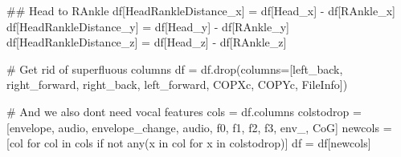 \documentclass[
  letterpaper,
  DIV=11,
  numbers=noendperiod]{scrreprt}
\newenvironment{Shaded}{\begin{snugshade}}{\end{snugshade}}
\newcommand{\BuiltInTok}[1]{\textcolor[rgb]{0.00,0.23,0.31}{#1}}
\newcommand{\CommentTok}[1]{\textcolor[rgb]{0.37,0.37,0.37}{#1}}
\newcommand{\ControlFlowTok}[1]{\textcolor[rgb]{0.00,0.23,0.31}{#1}}
\newcommand{\KeywordTok}[1]{\textcolor[rgb]{0.00,0.23,0.31}{#1}}
\newcommand{\NormalTok}[1]{\textcolor[rgb]{0.00,0.23,0.31}{#1}}
\newcommand{\OperatorTok}[1]{\textcolor[rgb]{0.37,0.37,0.37}{#1}}
\newcommand{\StringTok}[1]{\textcolor[rgb]{0.13,0.47,0.30}{#1}}
\begin{document}
\begin{Shaded}
\begin{Highlighting}[]
    \CommentTok{\#\# Head to RAnkle}
\NormalTok{    df[}\StringTok{\textquotesingle{}HeadRankleDistance\_x\textquotesingle{}}\NormalTok{] }\OperatorTok{=}\NormalTok{ df[}\StringTok{\textquotesingle{}Head\_x\textquotesingle{}}\NormalTok{] }\OperatorTok{{-}}\NormalTok{ df[}\StringTok{\textquotesingle{}RAnkle\_x\textquotesingle{}}\NormalTok{]}
\NormalTok{    df[}\StringTok{\textquotesingle{}HeadRankleDistance\_y\textquotesingle{}}\NormalTok{] }\OperatorTok{=}\NormalTok{ df[}\StringTok{\textquotesingle{}Head\_y\textquotesingle{}}\NormalTok{] }\OperatorTok{{-}}\NormalTok{ df[}\StringTok{\textquotesingle{}RAnkle\_y\textquotesingle{}}\NormalTok{]}
\NormalTok{    df[}\StringTok{\textquotesingle{}HeadRankleDistance\_z\textquotesingle{}}\NormalTok{] }\OperatorTok{=}\NormalTok{ df[}\StringTok{\textquotesingle{}Head\_z\textquotesingle{}}\NormalTok{] }\OperatorTok{{-}}\NormalTok{ df[}\StringTok{\textquotesingle{}RAnkle\_z\textquotesingle{}}\NormalTok{]}


    \CommentTok{\# Get rid of superfluous columns}
\NormalTok{    df }\OperatorTok{=}\NormalTok{ df.drop(columns}\OperatorTok{=}\NormalTok{[}\StringTok{\textquotesingle{}left\_back\textquotesingle{}}\NormalTok{, }\StringTok{\textquotesingle{}right\_forward\textquotesingle{}}\NormalTok{, }\StringTok{\textquotesingle{}right\_back\textquotesingle{}}\NormalTok{, }\StringTok{\textquotesingle{}left\_forward\textquotesingle{}}\NormalTok{, }\StringTok{\textquotesingle{}COPXc\textquotesingle{}}\NormalTok{, }\StringTok{\textquotesingle{}COPYc\textquotesingle{}}\NormalTok{, }\StringTok{\textquotesingle{}FileInfo\textquotesingle{}}\NormalTok{])}

    \CommentTok{\# And we also don\textquotesingle{}t need vocal features}
\NormalTok{    cols }\OperatorTok{=}\NormalTok{ df.columns}
\NormalTok{    colstodrop }\OperatorTok{=}\NormalTok{ [}\StringTok{\textquotesingle{}envelope\textquotesingle{}}\NormalTok{, }\StringTok{\textquotesingle{}audio\textquotesingle{}}\NormalTok{, }\StringTok{\textquotesingle{}envelope\_change\textquotesingle{}}\NormalTok{, }\StringTok{\textquotesingle{}audio\textquotesingle{}}\NormalTok{, }\StringTok{\textquotesingle{}f0\textquotesingle{}}\NormalTok{, }\StringTok{\textquotesingle{}f1\textquotesingle{}}\NormalTok{, }\StringTok{\textquotesingle{}f2\textquotesingle{}}\NormalTok{, }\StringTok{\textquotesingle{}f3\textquotesingle{}}\NormalTok{, }\StringTok{\textquotesingle{}env\_\textquotesingle{}}\NormalTok{, }\StringTok{\textquotesingle{}CoG\textquotesingle{}}\NormalTok{]}
\NormalTok{    newcols }\OperatorTok{=}\NormalTok{ [col }\ControlFlowTok{for}\NormalTok{ col }\KeywordTok{in}\NormalTok{ cols }\ControlFlowTok{if} \KeywordTok{not} \BuiltInTok{any}\NormalTok{(x }\KeywordTok{in}\NormalTok{ col }\ControlFlowTok{for}\NormalTok{ x }\KeywordTok{in}\NormalTok{ colstodrop)]}
\NormalTok{    df }\OperatorTok{=}\NormalTok{ df[newcols]   }
                

\end{Highlighting}
\end{Shaded}
\end{document}
